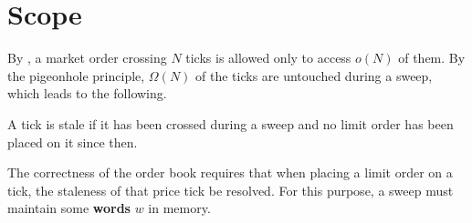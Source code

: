 \section{Scope} \label{sec:scope}
By , a market order crossing $N$ ticks is allowed only to access $o(N)$ of them. By the pigeonhole principle, $\Omega(N)$ of the ticks are untouched during a sweep, which leads to the following.
\begin{definition}[Staleness] \label{def:stale}
    A tick is stale if it has been crossed during a sweep and no limit order has been placed on it since then.
\end{definition}
The correctness of the order book requires that when placing a limit order on a tick, the staleness of that price tick be resolved. For this purpose, a sweep must maintain some \textbf{words} $w$ in memory.

